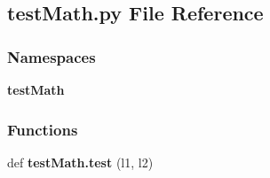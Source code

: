 \subsection{test\+Math.\+py File Reference}
\label{test_math_8py}
\subsubsection*{Namespaces}
\begin{DoxyCompactItemize}
\item 
 \textbf{ test\+Math}
\end{DoxyCompactItemize}
\subsubsection*{Functions}
\begin{DoxyCompactItemize}
\item 
def \textbf{ test\+Math.\+test} (l1, l2)
\end{DoxyCompactItemize}
